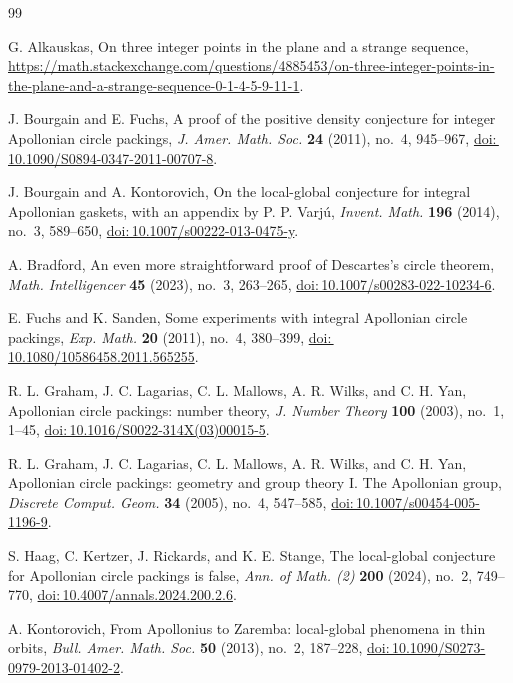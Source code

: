 \documentclass[12pt]{article}
\theoremstyle{definition}
\theoremstyle{remark}
\providecommand{\doi}[1]{\href{https://doi.org/#1}{doi:\,#1}}
\begin{document}
{\footnotesize
	\begin{thebibliography}{99}
		\setlength{\itemsep}{1pt}
		\setlength{\parskip}{0pt}
		
		G. Alkauskas,
		On three integer points in the plane and a strange sequence,
		\url{https://math.stackexchange.com/questions/4885453/on-three-integer-points-in-the-plane-and-a-strange-sequence-0-1-4-5-9-11-1}.
		
		J. Bourgain and E. Fuchs,
		A proof of the positive density conjecture for integer Apollonian circle packings,
		\emph{J. Amer. Math. Soc.} \textbf{24} (2011), no.~4, 945--967,
		\doi{10.1090/S0894-0347-2011-00707-8}.
		
		J. Bourgain and A. Kontorovich,
		On the local-global conjecture for integral Apollonian gaskets,
		with an appendix by P. P. Varj\'u,
		\emph{Invent. Math.} \textbf{196} (2014), no.~3, 589--650,
		\doi{10.1007/s00222-013-0475-y}.
		
		A. Bradford,
		An even more straightforward proof of Descartes's circle theorem,
		\emph{Math. Intelligencer} \textbf{45} (2023), no.~3, 263--265,
		\doi{10.1007/s00283-022-10234-6}.
		
		E. Fuchs and K. Sanden,
		Some experiments with integral Apollonian circle packings,
		\emph{Exp. Math.} \textbf{20} (2011), no.~4, 380--399,
		\doi{10.1080/10586458.2011.565255}.
		

		R. L. Graham, J. C. Lagarias, C. L. Mallows, A. R. Wilks, and C. H. Yan,
		Apollonian circle packings: number theory,
		\emph{J. Number Theory} \textbf{100} (2003), no.~1, 1--45,
		\doi{10.1016/S0022-314X(03)00015-5}.
		
		R. L. Graham, J. C. Lagarias, C. L. Mallows, A. R. Wilks, and C. H. Yan,
		Apollonian circle packings: geometry and group theory I. The Apollonian group,
		\emph{Discrete Comput. Geom.} \textbf{34} (2005), no.~4, 547--585,
		\doi{10.1007/s00454-005-1196-9}.
		
		S. Haag, C. Kertzer, J. Rickards, and K. E. Stange,
		The local-global conjecture for Apollonian circle packings is false,
		\emph{Ann. of Math. (2)} \textbf{200} (2024), no.~2, 749--770,
		\doi{10.4007/annals.2024.200.2.6}.
		
		A. Kontorovich,
		From Apollonius to Zaremba: local-global phenomena in thin orbits,
		\emph{Bull. Amer. Math. Soc.} \textbf{50} (2013), no.~2, 187--228,
		\doi{10.1090/S0273-0979-2013-01402-2}.
		

\end{thebibliography}}
\end{document}
